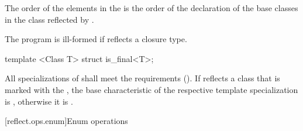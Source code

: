 \begin{std.txt}
\begin{itemdescr}
\pnum
The order of the elements in the  is the order of the declaration of the base classes in the class reflected by .

\pnum
\remarks
The program is ill-formed if  reflects a closure type.
\end{itemdescr}

\begin{itemdecl}
template <Class T> struct is_final<T>;
\end{itemdecl}

\begin{itemdescr}
\pnum
All specializations of  shall meet the  requirements (). If  reflects a class that is marked with the  , the base characteristic of the respective template specialization is , otherwise it is .
\end{itemdescr}

\end{std.txt}

[reflect.ops.enum]{Enum operations}

